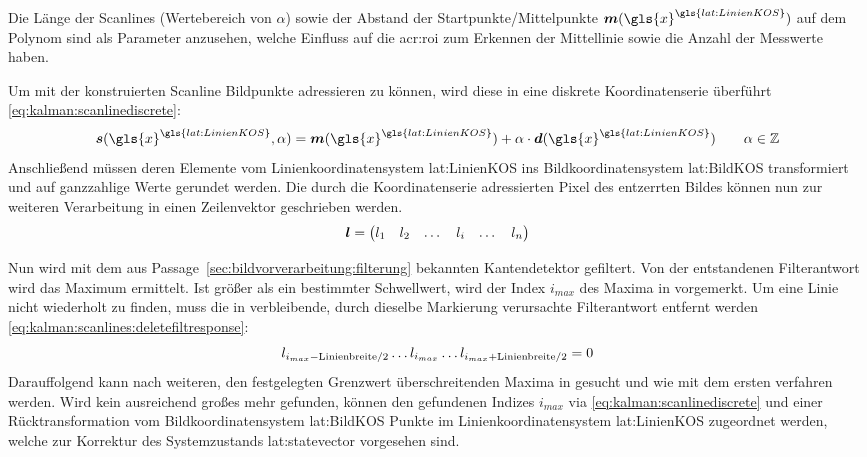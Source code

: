 Die Länge der Scanlines (Wertebereich von \(\alpha\)) sowie der Abstand der Startpunkte/Mittelpunkte \(\vct{m}(\gls{x}^{\gls{lat:LinienKOS}})\) auf dem Polynom sind als Parameter anzusehen, welche Einfluss auf die \gls{acr:roi} zum Erkennen der Mittellinie sowie die Anzahl der Messwerte haben.

Um mit der konstruierten Scanline Bildpunkte adressieren zu können, wird diese in eine diskrete Koordinatenserie überführt \eqref{eq:kalman:scanlinediscrete}:
\begin{equation}
\label{eq:kalman:scanlinediscrete}
\vct{s}(\gls{x}^{\gls{lat:LinienKOS}},\alpha) =
\vct{m}(\gls{x}^{\gls{lat:LinienKOS}})
  + \alpha \cdot \vct{d}(\gls{x}^{\gls{lat:LinienKOS}})
\qquad \alpha \in \mathbb{Z}
\end{equation}
Anschließend müssen deren Elemente vom Linienkoordinatensystem \gls{lat:LinienKOS} ins Bildkoordinatensystem \gls{lat:BildKOS} transformiert und auf ganzzahlige Werte gerundet werden.
Die durch die Koordinatenserie adressierten Pixel des entzerrten Bildes können nun zur weiteren Verarbeitung in einen Zeilenvektor  geschrieben werden. 
 \begin{equation}
 \boldsymbol{l} =
 \begin{pmatrix}
 l_1 & l_2 & \dots & l_i & \dots & l_n
 \end{pmatrix}
 \end{equation}
 
Nun wird  mit dem aus Passage~\ref{sec:bildvorverarbeitung:filterung} bekannten Kantendetektor gefiltert. Von der entstandenen Filterantwort  wird das Maximum  ermittelt. Ist  größer als ein bestimmter Schwellwert, wird der Index \begin{math} i_{max} \end{math} des Maxima in  vorgemerkt. Um eine Linie nicht wiederholt zu finden, muss die in  verbleibende, durch dieselbe Markierung verursachte Filterantwort entfernt werden \eqref{eq:kalman:scanlines:deletefiltresponse}:
\begin{equation}
\label{eq:kalman:scanlines:deletefiltresponse}
l_{i_{max}-\text{Linienbreite}/2} \dots l_{i_{max}} 
 \dots  l_{i_{max}+\text{Linienbreite}/2} = 0
 \end{equation}
Darauffolgend kann nach weiteren, den festgelegten Grenzwert überschreitenden Maxima in  gesucht und wie mit dem ersten  verfahren werden.
Wird kein ausreichend großes  mehr gefunden, können den gefundenen Indizes \begin{math} i_{max} \end{math} via \eqref{eq:kalman:scanlinediscrete} und einer Rücktransformation vom Bildkoordinatensystem \gls{lat:BildKOS} Punkte  im Linienkoordinatensystem \gls{lat:LinienKOS} zugeordnet werden, welche zur Korrektur des Systemzustands \gls{lat:statevector} vorgesehen sind.

